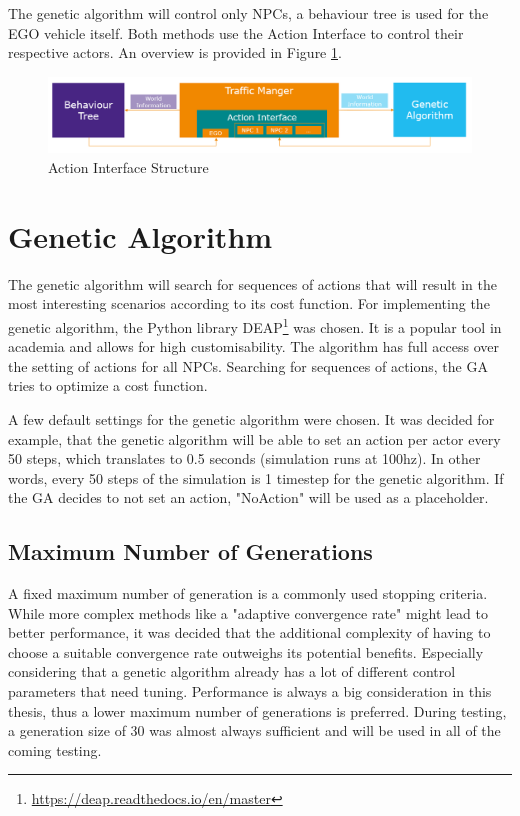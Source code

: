 The genetic algorithm will control only NPCs, a behaviour tree is used for the EGO vehicle itself. Both methods use the Action Interface to control their respective actors. An overview is provided in Figure \ref{fig:implementation:traffic_manager_structure}.

\begin{figure}[ht] 
	\includegraphics[width=1\linewidth]{figures/tm_structure}
	\caption{Action Interface Structure}
	\label{fig:implementation:traffic_manager_structure}
\end{figure}

\section{Genetic Algorithm}
The genetic algorithm will search for sequences of actions that will result in the most interesting scenarios according to its cost function.
For implementing the genetic algorithm, the Python library DEAP\footnote{\url{https://deap.readthedocs.io/en/master}} was chosen. It is a popular tool in academia and allows for high customisability.
The algorithm has full access over the setting of actions for all NPCs. Searching for sequences of actions, the GA tries to optimize a cost function.

A few default settings for the genetic algorithm were chosen. It was decided for example, that the genetic algorithm will be able to set an action per actor every 50 steps, which translates to 0.5 seconds (simulation runs at 100hz). In other words, every 50 steps of the simulation is 1 timestep for the genetic algorithm. If the GA decides to not set an action, "NoAction" will be used as a placeholder.

\subsection{Maximum Number of Generations}
A fixed maximum number of generation is a commonly used stopping criteria. While more complex methods like a "adaptive convergence rate" might lead to better performance, it was decided that the additional complexity of having to choose a suitable convergence rate outweighs its potential benefits. Especially considering that a genetic algorithm already has a lot of different control parameters that need tuning. Performance is always a big consideration in this thesis, thus a lower maximum number of generations is preferred. During testing, a generation size of 30 was almost always sufficient and will be used in all of the coming testing.

